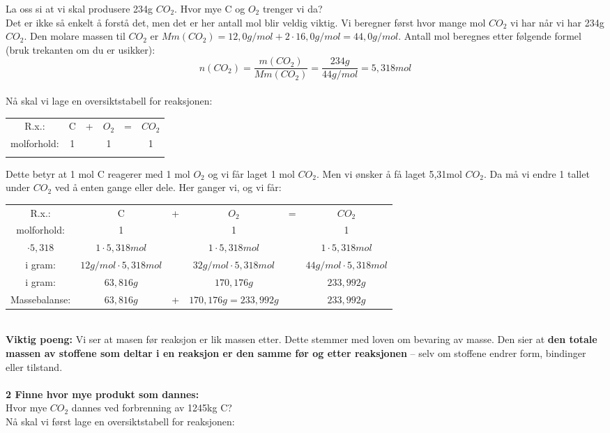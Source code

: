 \documentclass[12pt,a4paper]{article}
\begin{document}
\noindent La oss si at vi skal produsere 234g $CO_2$. Hvor mye C og $O_2$ trenger vi da? \\
Det er ikke så enkelt å forstå det, men det er her antall mol blir veldig viktig.  Vi beregner først hvor mange mol $CO_2$ vi har når vi har 234g $CO_2$.  Den molare massen til $CO_2$ er $Mm(CO_2)=12,0g/mol+2\cdot 16,0g/mol=44,0g/mol$.  Antall mol beregnes etter følgende formel (bruk trekanten om du er usikker):\\
$$n(CO_2)=\frac{m(CO_2)}{Mm(CO_2)}=\frac{234g}{44g/mol}=5,318mol$$\\
Nå skal vi lage en oversiktstabell for reaksjonen:


\begin{table}[h!]
    \centering
    \begin{tabular}{cccccc}
         R.x.:&  C&  +&  $O_2$&  =& $CO_2$\\
         molforhold:&1  &  & 1 &  &1 \\
         &  &  &  &  & \\
    \end{tabular}
\end{table}
Dette betyr at 1 mol C reagerer med 1 mol $O_2$ og vi får laget 1 mol $CO_2$.  Men vi ønsker å få laget 5,31mol $CO_2$.  Da må vi endre 1 tallet under $CO_2$ ved å enten gange eller dele.\newpage  
Her ganger vi, og vi får:
\begin{table}[h!]
    \centering
    \begin{tabular}{cccccc}
         R.x.:&  C&  +&  $O_2$&  =& $CO_2$\\
         molforhold:&1  &  & 1 &  &1 \\
         $\cdot 5,318$&$1\cdot 5,318mol$  & &  $1\cdot 5,318mol$&  &$1\cdot 5,318mol$ \\
         i gram:&$12g/mol\cdot 5,318mol$  & &  $32g/mol\cdot 5,318mol$&  &$44g/mol\cdot 5,318mol$ \\
         i gram:&$63,816g$  & &  $170,176g$&  &$233,992g$ \\
         Massebalanse:&$63,816g$  & +&  $170,176g=233,992g$&  &$233,992g$ \\
    \end{tabular}
\end{table}\\
\textbf{Viktig poeng:} Vi ser at masen før reaksjon er lik massen etter.  Dette stemmer med loven om bevaring av masse.  Den sier at \textbf{den totale massen av stoffene som deltar i en reaksjon er den samme før og etter reaksjonen} – selv om stoffene endrer form, bindinger eller tilstand. \\\\
\textbf{2 Finne hvor mye produkt som dannes:}\\
Hvor mye $CO_2$ dannes ved forbrenning av 1245kg C?\\
Nå skal vi først lage en oversiktstabell for reaksjonen:
\end{document}
